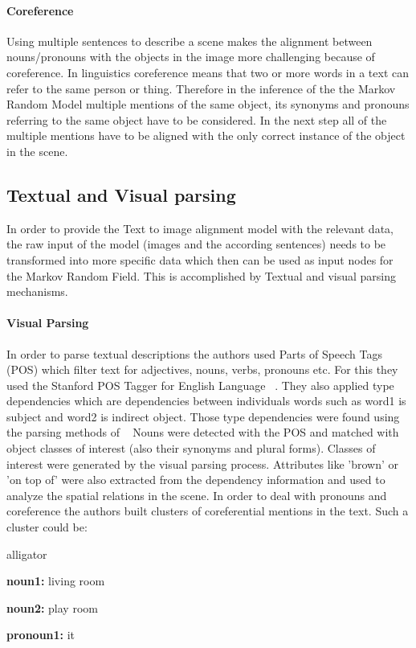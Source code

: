 \documentclass{utue} %
\begin{document}
\paragraph{Coreference}
Using multiple sentences to describe a scene makes the alignment between nouns/pronouns with the objects in the image more challenging because of coreference. In linguistics coreference means that two or more words in a text can refer to the same person or thing. Therefore in the inference of the the Markov Random Model multiple mentions of the same object, its synonyms and pronouns referring to the same object have to be considered. In the next step all of the multiple mentions have to be aligned with the only correct instance of the object in the scene.

\subsection{Textual and Visual parsing} \label{Textual and Visual parsing}
In order to provide the Text to image alignment model with the relevant data, the raw input of the model (images and the according sentences) needs to be transformed into more specific data which then can be used as input nodes for the Markov Random Field. This is accomplished by Textual and visual parsing mechanisms.
\paragraph{Visual Parsing}
In order to parse textual descriptions the authors used Parts of Speech Tags (POS) which filter text for adjectives, nouns, verbs, pronouns etc. For this they used the Stanford POS Tagger for English Language ~\cite{toutanova2003}. They also applied type dependencies which are dependencies between individuals words such as word1 is subject and word2 is indirect object. Those type dependencies were found using the parsing methods of ~\cite{demarneffe2006} Nouns were detected with the POS and matched with object classes of interest (also their synonyms and plural forms). Classes of interest were generated by the visual parsing process. Attributes like 'brown' or 'on top of' were also extracted from the dependency information and used to analyze the spatial relations in the scene. In order to deal with pronouns and coreference the authors built clusters of coreferential mentions in the text. Such a cluster could be: 

\begin{labeling}{alligator}
\item [\textbf{noun1:}]    living room
\item [\textbf{noun2:}]    play room
\item [\textbf{pronoun1:}] it
\end{labeling}
\end{document}
